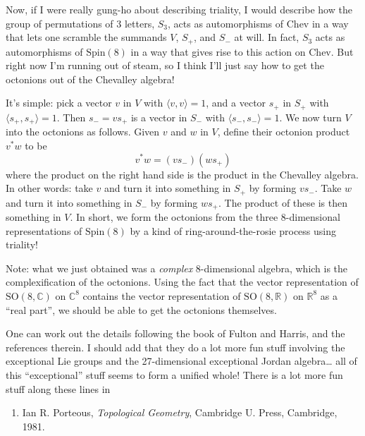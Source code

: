 \documentclass{article}
\def\tightlist{}
\begin{document}
Now, if I were really gung-ho about describing triality, I would
describe how the group of permutations of 3 letters, \(S_3\), acts as
automorphisms of \(\mathrm{Chev}\) in a way that lets one scramble the
summands \(V\), \(S_+\), and \(S_-\) at will. In fact, \(S_3\) acts as
automorphisms of \(\mathrm{Spin}(8)\) in a way that gives rise to this
action on \(\mathrm{Chev}\). But right now I'm running out of steam, so
I think I'll just say how to get the octonions out of the Chevalley
algebra!

It's simple: pick a vector \(v\) in \(V\) with
\(\langle v,v \rangle = 1\), and a vector \(s_+\) in \(S_+\) with
\(\langle s_+,s_+ \rangle = 1\). Then \(s_- = vs_+\) is a vector in
\(S_-\) with \(\langle s_-,s_- \rangle = 1\). We now turn \(V\) into the
octonions as follows. Given \(v\) and \(w\) in \(V\), define their
octonion product \(v^*w\) to be \[v^*w = (v s_-) (w s_+)\] where the
product on the right hand side is the product in the Chevalley algebra.
In other words: take \(v\) and turn it into something in \(S_+\) by
forming \(v s_-\). Take \(w\) and turn it into something in \(S_-\) by
forming \(w s_+\). The product of these is then something in \(V\). In
short, we form the octonions from the three 8-dimensional
representations of \(\mathrm{Spin}(8)\) by a kind of
ring-around-the-rosie process using triality!

Note: what we just obtained was a \emph{complex} 8-dimensional algebra,
which is the complexification of the octonions. Using the fact that the
vector representation of \(\mathrm{SO}(8,\mathbb{C})\) on
\(\mathbb{C}^8\) contains the vector representation of
\(\mathrm{SO}(8,\mathbb{R})\) on \(\mathbb{R}^8\) as a ``real part'', we
should be able to get the octonions themselves.

One can work out the details following the book of Fulton and Harris,
and the references therein. I should add that they do a lot more fun
stuff involving the exceptional Lie groups and the 27-dimensional
exceptional Jordan algebra\ldots{} all of this ``exceptional'' stuff
seems to form a unified whole! There is a lot more fun stuff along these
lines in

\begin{enumerate}
\def\labelenumi{\arabic{enumi})}
\setcounter{enumi}{2}
\tightlist
\item
  Ian R. Porteous, \emph{Topological Geometry}, Cambridge U. Press,
  Cambridge, 1981.
\end{enumerate}
\end{document}
